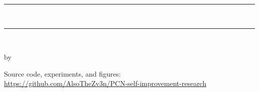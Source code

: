 \begin{titlepage}
\centering
\thispagestyle{empty}
\vspace*{2cm}

\rule{\textwidth}{0.4pt}\\[0.5cm]
{\Huge\bfseries \thesistitle \par}
\rule{\textwidth}{0.4pt}\\[1.0cm]

{\large\itshape \thesissubtitle \par}
\vspace{3cm}

{\large by \par}
{\Large\bfseries \thesisauthor \par}
\vfill

{\large \thesissubmissiondate \par}
\vspace{1cm}

{\footnotesize Source code, experiments, and figures:\\
\url{https://github.com/AlsoTheZv3n/PCN-self-improvement-research} \par}
\vspace{1cm}
\end{titlepage}
